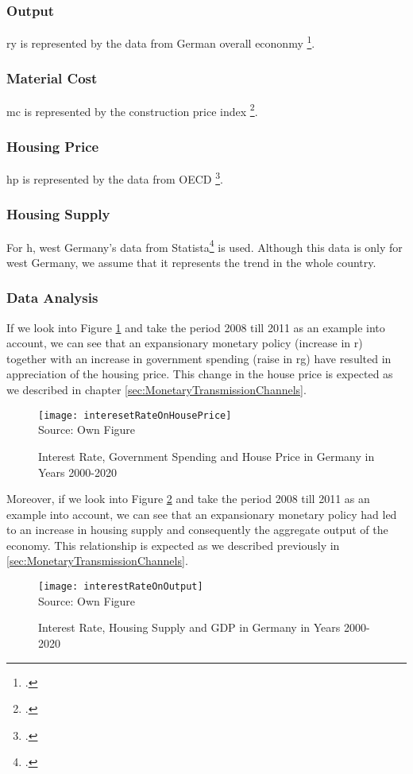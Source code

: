 \subsubsection{Output} 

\ac{ry} is represented by the data from German overall econonmy \footcite[See.][]{BundesBank}.

\subsubsection{Material Cost} 

\ac{mc} is represented by the construction price index \footcite[See.][]{BundesBank}.

\subsubsection{Housing Price} 
\ac{hp} is represented by the data from OECD \footcite[See.][]{OECD}.

\subsubsection{Housing Supply} 
For \ac{h}, west Germany's data from Statista\footcite[See.][]{Statista} is used. Although this data is only for west Germany, we assume that it represents the trend in the whole country.

\subsubsection{Data Analysis} \label{subsec:dataAnalysis}
If we look into Figure \ref{irhp} and take the period 2008 till 2011 as an example into account, we can see that an expansionary monetary policy  (increase in \ac{r}) together with an increase in government spending (raise in \ac{rg})  have resulted in appreciation of the housing price. This change in the house price is expected as we described in chapter \ref{sec:MonetaryTransmissionChannels}.   

\begin{figure}[H]
\caption{Interest Rate, Government Spending and House Price in Germany in Years 2000-2020}\label{irhp}
\texttt{[image: interesetRateOnHousePrice]}
\\
Source: Own Figure
\end{figure}

Moreover, if we look into Figure \ref{irgdp} and take the period 2008 till 2011 as an example into account, we can see that an expansionary monetary policy had led to an increase in housing supply and consequently the aggregate output of the economy. This relationship is expected as we described previously in \ref{sec:MonetaryTransmissionChannels}.   



\begin{figure}[H]
\caption{Interest Rate, Housing Supply and GDP in Germany in Years 2000-2020}\label{irgdp}
\texttt{[image: interestRateOnOutput]}
\\
Source: Own Figure
\end{figure}







